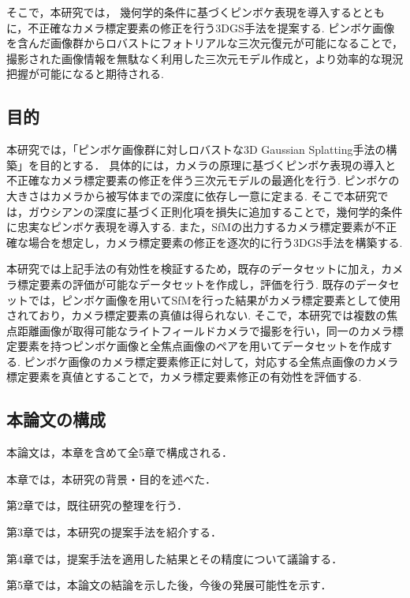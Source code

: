 そこで，本研究では， 幾何学的条件に基づくピンボケ表現を導入するとともに，不正確なカメラ標定要素の修正を行う3DGS手法を提案する.
ピンボケ画像を含んだ画像群からロバストにフォトリアルな三次元復元が可能になることで，撮影された画像情報を無駄なく利用した三次元モデル作成と，より効率的な現況把握が可能になると期待される.\par

\subsection{目的}\label{subsec:objective}

本研究では，「ピンボケ画像群に対しロバストな3D Gaussian Splatting手法の構築」を目的とする．
具体的には，カメラの原理に基づくピンボケ表現の導入と不正確なカメラ標定要素の修正を伴う三次元モデルの最適化を行う.
ピンボケの大きさはカメラから被写体までの深度に依存し一意に定まる.
そこで本研究では，ガウシアンの深度に基づく正則化項を損失に追加することで，幾何学的条件に忠実なピンボケ表現を導入する.
また，SfMの出力するカメラ標定要素が不正確な場合を想定し，カメラ標定要素の修正を逐次的に行う3DGS手法を構築する.\par

本研究では上記手法の有効性を検証するため，既存のデータセットに加え，カメラ標定要素の評価が可能なデータセットを作成し，評価を行う.
既存のデータセットでは，ピンボケ画像を用いてSfMを行った結果がカメラ標定要素として使用されており，カメラ標定要素の真値は得られない.
そこで，本研究では複数の焦点距離画像が取得可能なライトフィールドカメラで撮影を行い，同一のカメラ標定要素を持つピンボケ画像と全焦点画像のペアを用いてデータセットを作成する.
ピンボケ画像のカメラ標定要素修正に対して，対応する全焦点画像のカメラ標定要素を真値とすることで，カメラ標定要素修正の有効性を評価する.

\subsection{本論文の構成}\label{subsec:construction}

本論文は，本章を含めて全5章で構成される．

本章では，本研究の背景・目的を述べた．

第2章では，既往研究の整理を行う．

第3章では，本研究の提案手法を紹介する．

第4章では，提案手法を適用した結果とその精度について議論する．

第5章では，本論文の結論を示した後，今後の発展可能性を示す．